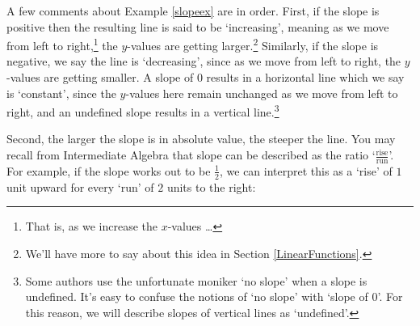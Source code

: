 \documentclass{ximera}
\begin{document}
\begin{example}
\begin{explanation}
\begin{enumerate}

\end{enumerate}

\label{slopeex}



\end{explanation}

\end{example} 


A few comments about Example \ref{slopeex} are in order.  First, if the slope is positive then the resulting line is said to be `increasing', meaning as we move from left to right,\footnote{That is, as we increase the $x$-values \ldots} the $y$-values are getting larger.\footnote{We'll have more to say about this idea in Section \ref{LinearFunctions}.}  Similarly, if the slope is negative, we say the line is `decreasing', since as we move from left to right, the $y$-values are getting smaller.  A slope of $0$ results in a horizontal line which we say is `constant', since the $y$-values here remain unchanged as we move from left to right,  and an undefined slope results in a vertical line.\footnote{Some authors use the unfortunate moniker `no slope' when a slope is undefined.  It's easy to confuse the notions of `no slope' with `slope of $0$'.  For this reason, we will describe slopes of vertical lines as `undefined'.}   


Second, the larger the slope is in absolute value, the steeper the line.  You may recall from Intermediate Algebra that slope can be described as the ratio `$\frac{\text{rise}}{\text{run}}$'.  For example, if the slope works out to be $\frac{1}{2}$, we can interpret this as a `rise' of $1$ unit upward for every `run' of $2$ units to the right:
\end{document}
